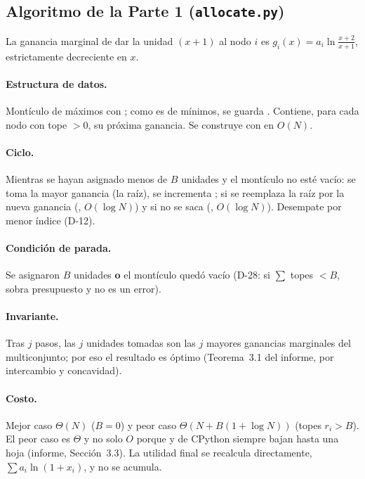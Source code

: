\documentclass[11pt,a4paper]{article}
\begin{document}
\subsection{Algoritmo de la Parte 1 (\texttt{allocate.py})}

La ganancia marginal de dar la unidad $(x+1)$ al nodo $i$ es $g_i(x)=a_i\ln\frac{x+2}{x+1}$, estrictamente decreciente en $x$.

\paragraph{Estructura de datos.} Montículo de máximos con ; como  es de mínimos, se guarda . Contiene, para cada nodo con tope $>0$, su próxima ganancia. Se construye con  en $O(N)$.

\paragraph{Ciclo.} Mientras se hayan asignado menos de $B$ unidades y el montículo no esté vacío: se toma la mayor ganancia (la raíz), se incrementa ; si  se reemplaza la raíz por la nueva ganancia (, $O(\log N)$) y si no se saca (, $O(\log N)$). Desempate por menor índice (D-12).

\paragraph{Condición de parada.} Se asignaron $B$ unidades \textbf{o} el montículo quedó vacío (D-28: si $\sum$ topes $<B$, sobra presupuesto y no es un error).

\paragraph{Invariante.} Tras $j$ pasos, las $j$ unidades tomadas son las $j$ mayores ganancias marginales del multiconjunto; por eso el resultado es óptimo (Teorema~3.1 del informe, por intercambio y concavidad).

\paragraph{Costo.} Mejor caso $\Theta(N)$ ($B=0$) y peor caso $\Theta(N+B(1+\log N))$ (topes $r_i>B$). El peor caso es $\Theta$ y no solo $O$ porque  y  de CPython siempre bajan hasta una hoja (informe, Sección~3.3). La utilidad final se recalcula directamente, $\sum a_i\ln(1+x_i)$, y no se acumula.
\end{document}
